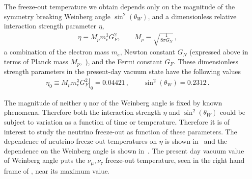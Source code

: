 The freeze-out temperature we obtain depends only on the magnitude of the symmetry breaking Weinberg angle $\sin^2(\theta_W)$, and a dimensionless relative interaction strength parameter $\eta$,
\begin{align}\label{etaCTY}
\eta\equiv M_p m_e^3 G_F^2, \qquad M_p\equiv\sqrt{\frac{1}{8\pi G_N}}\,, 
\end{align}
a combination of the electron mass $m_e$, Newton constant $G_N$ (expressed above in terms of Planck mass $M_p$,~), and the Fermi constant $G_F$. These dimensionless strength parameters in the present-day vacuum state have the following values
\begin{align}\label{eta0CTY}
\eta_0\equiv \left.M_p m_e^3 G_F^2\right|_0 = 0.04421\,, \qquad \sin^2(\theta_W)=0.2312\,.
\end{align}

The magnitude of neither $\eta$ nor of the Weinberg angle is fixed by known phenomena. Therefore both the interaction strength $\eta$ and $\sin^2(\theta_W)$ could be subject to variation as a function of time or temperature. Therefore it is of interest to study the neutrino freeze-out as function of these parameters. The dependence of neutrino freeze-out temperatures on $\eta$ is shown in~ and the dependence on the Weinberg angle is shown in~. The present day vacuum value of Weinberg angle puts the $\nu_\mu,\nu_\tau$ freeze-out temperature, seen in the right hand frame of , near its maximum value.
 
